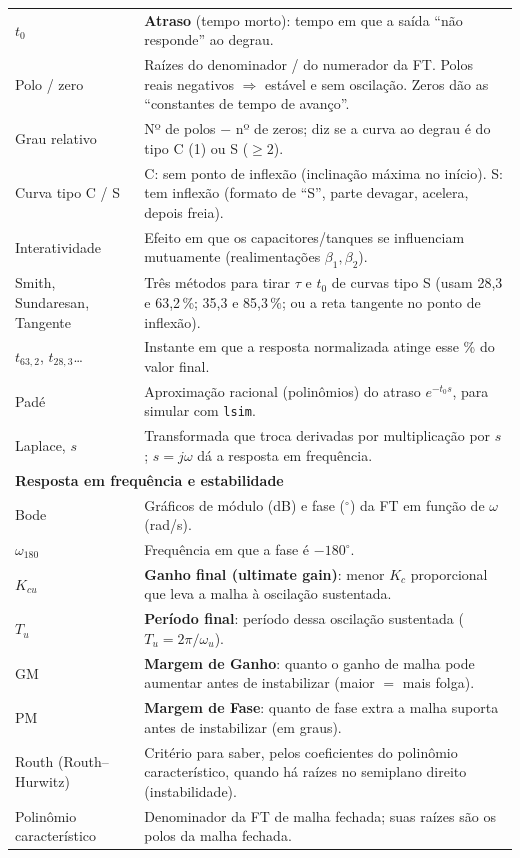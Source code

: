 \documentclass[11pt,a4paper]{article}
\begin{document}
\begin{center}
\begin{longtable}{p{2.7cm}p{12.3cm}}
$t_0$ & \textbf{Atraso} (tempo morto): tempo em que a saída ``não responde'' ao degrau.\\
Polo / zero & Raízes do denominador / do numerador da FT. Polos reais negativos $\Rightarrow$ estável e sem oscilação. Zeros dão as ``constantes de tempo de avanço''.\\
Grau relativo & Nº de polos $-$ nº de zeros; diz se a curva ao degrau é do tipo C (1) ou S ($\ge2$).\\
Curva tipo C / S & C: sem ponto de inflexão (inclinação máxima no início). S: tem inflexão (formato de ``S'', parte devagar, acelera, depois freia).\\
Interatividade & Efeito em que os capacitores/tanques se influenciam mutuamente (realimentações $\beta_1,\beta_2$).\\
Smith, Sundaresan, Tangente & Três métodos para tirar $\tau$ e $t_0$ de curvas tipo S (usam 28,3 e 63,2\,\%; 35,3 e 85,3\,\%; ou a reta tangente no ponto de inflexão).\\
$t_{63,2}$, $t_{28,3}$\ldots & Instante em que a resposta normalizada atinge esse \% do valor final.\\
Padé & Aproximação racional (polinômios) do atraso $e^{-t_0s}$, para simular com \texttt{lsim}.\\
Laplace, $s$ & Transformada que troca derivadas por multiplicação por $s$; $s=j\omega$ dá a resposta em frequência.\\
\multicolumn{2}{l}{\textbf{Resposta em frequência e estabilidade}}\\
Bode & Gráficos de módulo (dB) e fase ($^\circ$) da FT em função de $\omega$ (rad/s).\\
$\omega_{180}$ & Frequência em que a fase é $-180^\circ$.\\
$K_{cu}$ & \textbf{Ganho final (ultimate gain)}: menor $K_c$ proporcional que leva a malha à oscilação sustentada.\\
$T_u$ & \textbf{Período final}: período dessa oscilação sustentada ($T_u=2\pi/\omega_u$).\\
GM & \textbf{Margem de Ganho}: quanto o ganho de malha pode aumentar antes de instabilizar (maior $=$ mais folga).\\
PM & \textbf{Margem de Fase}: quanto de fase extra a malha suporta antes de instabilizar (em graus).\\
Routh (Routh--Hurwitz) & Critério para saber, pelos coeficientes do polinômio característico, quando há raízes no semiplano direito (instabilidade).\\
Polinômio característico & Denominador da FT de malha fechada; suas raízes são os polos da malha fechada.\\

\end{longtable}
\end{center}
\end{document}
